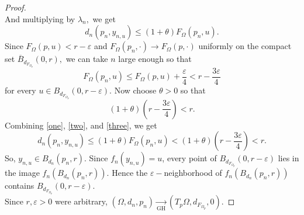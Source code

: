 \documentclass[letterpaper, 11pt, reqno]{amsart}
\newtheorem{thm}{Theorem}[section]
\theoremstyle{definition}
\begin{document}
\begin{proof}
\begin{equation}
    \end{equation}
    And multiplying by $\lambda_n,$ we get
    \begin{equation}\label{one}
        d_n(p_n,y_{n,u}) \leq (1+\theta)F_\Omega(p_n,u).
    \end{equation}
    Since $F_\Omega(p,u) < r-\varepsilon$ and $F_\Omega(p_n, \cdot) \longrightarrow F_\Omega(p,\cdot)$ uniformly on the compact set $\overline{B}_{d_{F_{\Omega_p}}}(0,r),$ we can take $n$ large enough so that
    \begin{equation}\label{two}
        F_\Omega(p_n,u) \leq F_\Omega(p,u) + \frac{\varepsilon}{4} < r-\frac{3\varepsilon}{4}
    \end{equation}
    for every $u \in B_{d_{F_{\Omega_p}}}(0,r-\varepsilon).$ Now choose $\theta>0$ so that 
    \begin{equation}\label{three}
        (1+\theta)(r-\frac{3\varepsilon}{4})<r.
    \end{equation}
    Combining \ref{one}, \ref{two}, and \ref{three}, we get
    \begin{equation}
        d_n(p_n,y_{n,u}) \leq (1+\theta)F_\Omega(p_n,u)<(1+\theta)(r-\frac{3\varepsilon}{4}) < r.
    \end{equation}
    So, $y_{n,u} \in B_{d_n}(p_n,r)$.    
    Since $f_n(y_{n,u})=u$, every point of $B_{d_{F_{\Omega_p}}}(0,r-\varepsilon)$ lies in the image $f_n(B_{d_n}(p_n,r)).$ Hence the $\varepsilon-$neighborhood of $f_n(B_{d_n}(p_n,r))$ contains $B_{d_{F_{\Omega_p}}}(0,r-\varepsilon)$. \\
    Since $r,\varepsilon>0$ were arbitrary, $ (\Omega,d_n,p_n) \xrightarrow[\text{GH}]{\text{}} (T_p\Omega,d_{F_{{\Omega_p}}},0).$
\end{proof}

\end{document}
